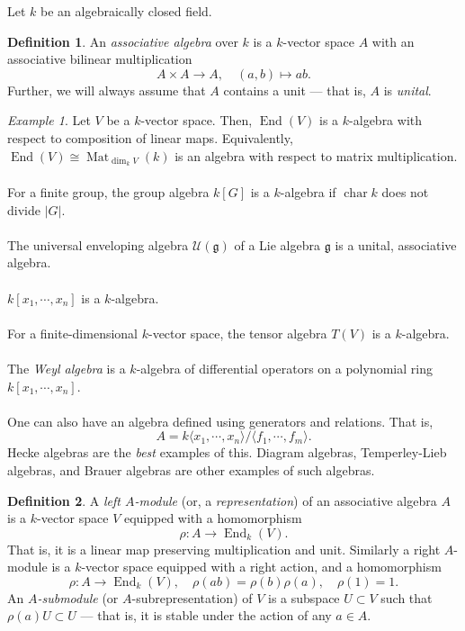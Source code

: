 \documentclass[a4paper]{report}
\theoremstyle{definition}
\newtheorem{definition}{Definition}
\theoremstyle{remark}
\theoremstyle{proposition}
\theoremstyle{conjecture}
\theoremstyle{lemma}
\theoremstyle{corollary}
\theoremstyle{exercise}
\theoremstyle{example}
\newtheorem{example}{Example}
\newcommand{\mcal}{\mathcal}
\newcommand{\on}{\operatorname}
\begin{document}
Let $k$ be an algebraically closed field.

\begin{definition}
    An \emph{associative algebra} over $k$ is a $k$-vector space 
    $A$ with an associative bilinear multiplication 
    $$A\times A \longrightarrow A,\quad (a,b)\longmapsto ab.$$
    Further, we will always assume that $A$ contains a unit --- that is,
    $A$ is \emph{unital}.
\end{definition}

\begin{example}
    Let $V$ be a $k$-vector space. Then, $\on{End}(V)$ is a $k$-algebra
    with respect to composition of linear maps. Equivalently,
    $\on{End}(V)\cong \on{Mat}_{\dim_kV}(k)$ is an algebra with respect
    to matrix multiplication.\\\\
    For a finite group, the group algebra $k[G]$ is a $k$-algebra if 
    $\on{char}k$ does not divide $\vert G\vert$.\\\\
    The universal enveloping algebra $\mcal{U}(\mathfrak{g})$ of a Lie algebra
    $\mathfrak{g}$ is a unital, associative algebra.\\\\
    $k[x_1,\cdots,x_n]$ is a $k$-algebra.\\\\
    For a finite-dimensional $k$-vector space, the tensor algebra 
    $T(V)$ is a $k$-algebra.\\\\
    The \emph{Weyl algebra} is a $k$-algebra of differential operators 
    on a polynomial ring $k[x_1,\cdots,x_n]$.\\\\
    One can also have an algebra defined using generators and relations.
    That is, 
    $$A = k\langle x_1,\cdots,x_n\rangle /\langle f_1,\cdots,f_m\rangle.$$
    Hecke algebras are the \emph{best} examples of this. Diagram algebras,
    Temperley-Lieb algebras, and Brauer algebras are other examples
    of such algebras.
\end{example}

\begin{definition}
    A \emph{left $A$-module} (or, a \emph{representation}) of an 
    associative algebra $A$ is a $k$-vector space $V$ equipped with a
    homomorphism
    $$\rho : A \longrightarrow \on{End}_k(V).$$
    That is, it is a linear map preserving multiplication and unit.
    Similarly a right $A$-module is a $k$-vector space equipped with a right
    action, and a homomorphism
    $$\rho : A \longrightarrow \on{End}_k(V),\quad \rho(ab) = \rho(b)\rho(a),\quad \rho(1)=1.$$
    An \emph{$A$-submodule} (or $A$-subrepresentation) of $V$ is a subspace 
    $U\subset V$ such that $\rho(a)U\subset U$ --- that is, it is 
    stable under the action of any $a \in A$.
\end{definition}
\end{document}
